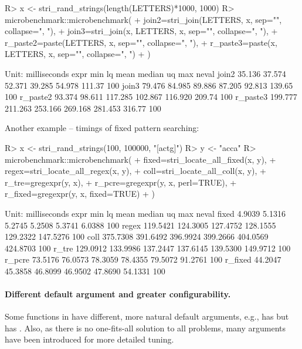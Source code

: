 \documentclass[nojss]{jss}
\begin{document}
\begin{Schunk}
\begin{Sinput}
R> x <- stri_rand_strings(length(LETTERS)*1000, 1000)
R> microbenchmark::microbenchmark(
+    join2=stri_join(LETTERS, x, sep="", collapse=", "),
+    join3=stri_join(x, LETTERS, x, sep="", collapse=", "),
+    r_paste2=paste(LETTERS, x, sep="", collapse=", "),
+    r_paste3=paste(x, LETTERS, x, sep="", collapse=", ")
+  )
\end{Sinput}
\begin{Soutput}
Unit: milliseconds
     expr     min      lq    mean  median      uq    max neval
    join2  35.136  37.574  52.371  39.285  54.978 111.37   100
    join3  79.476  84.985  89.886  87.205  92.813 139.65   100
 r_paste2  93.374  98.611 117.285 102.867 116.920 209.74   100
 r_paste3 199.777 211.263 253.166 269.168 281.453 316.77   100
\end{Soutput}
\end{Schunk}

Another example -- timings of fixed pattern searching:

\begin{Schunk}
\begin{Sinput}
R> x <- stri_rand_strings(100, 100000, "[actg]")
R> y <- "acca"
R> microbenchmark::microbenchmark(
+    fixed=stri_locate_all_fixed(x, y),
+    regex=stri_locate_all_regex(x, y),
+    coll=stri_locate_all_coll(x, y),
+    r_tre=gregexpr(y, x),
+    r_pcre=gregexpr(y, x, perl=TRUE),
+    r_fixed=gregexpr(y, x, fixed=TRUE)
+  )
\end{Sinput}
\begin{Soutput}
Unit: milliseconds
    expr      min       lq     mean   median       uq      max neval
   fixed   4.9039   5.1316   5.2745   5.2508   5.3741   6.0388   100
   regex 119.5421 124.3005 127.4752 128.1555 129.2322 147.5276   100
    coll 375.7308 391.6492 396.9924 399.2666 404.0569 424.8703   100
   r_tre 129.0912 133.9986 137.2447 137.6145 139.5300 149.9712   100
  r_pcre  73.5176  76.0573  78.3059  78.4355  79.5072  91.2761   100
 r_fixed  44.2047  45.3858  46.8099  46.9502  47.8690  54.1331   100
\end{Soutput}
\end{Schunk}


\paragraph{Different default argument and greater configurability.}
Some functions in  have different,
more natural default arguments,
e.g.,  has  but
 has .
Also, as there is no one-fits-all solution to all problems,
many arguments have been introduced for more detailed tuning.
\end{document}
